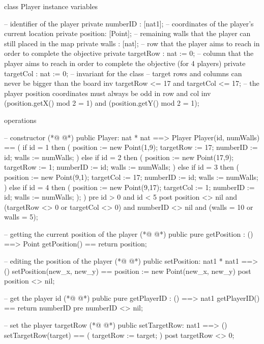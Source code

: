 \begin{vdmpp}[breaklines=true]
class Player
instance variables

   -- identifier of the player
   private numberID : [nat1];
   -- coordinates of the player's current location
   private position: [Point];
   -- remaining walls that the player can still placed in the map
   private walls : [nat];
   -- row that the player aims to reach in order to complete the objective
   private targetRow : nat := 0;
   -- column that the player aims to reach in order to complete the objective (for 4 players)
   private targetCol : nat := 0;
   -- invariant for the class
   -- target rows and columns can never be bigger than the board
   inv targetRow <= 17 and targetCol <= 17;
   -- the player position coordinates must always be odd in row and col
   inv (position.getX() mod 2 = 1) and (position.getY() mod 2 = 1);
   
operations

   -- constructor
(*@
\label{Player:23}
@*)
   public Player: nat * nat ==> Player
   Player(id, numWalls) ==
   (
    if id = 1
    then (
     position := new Point(1,9);
     targetRow := 17;
     numberID := id;
     walls := numWalls;
    )
    else if id = 2
    then (
     position := new Point(17,9);
     targetRow := 1;
     numberID := id;
     walls := numWalls;
    )
    else if id = 3
    then (
     position := new Point(9,1);
     targetCol := 17;
     numberID := id;
     walls := numWalls;
    )
    else if id = 4
    then (
     position := new Point(9,17);
     targetCol := 1;
     numberID := id;
     walls := numWalls;
    );
   )
   pre id > 0 and id < 5
   post position <> nil and (targetRow <> 0 or targetCol <> 0) and numberID <> nil and (walls = 10 or walls = 5);
   
   -- getting the current position of the player
(*@
\label{getPosition:59}
@*)
   public pure getPosition : () ==> Point 
   getPosition() == return position;
   
   -- editing the position of the player
(*@
\label{setPosition:63}
@*)
   public setPosition: nat1 * nat1 ==> ()
   setPosition(new_x, new_y) ==
    position := new Point(new_x, new_y)
   post position <> nil;

   -- get the player id
(*@
\label{getPlayerID:69}
@*)
   public pure getPlayerID : () ==> nat1
   getPlayerID() ==
    return numberID
   pre numberID <> nil;
   
   -- set the player targetRow
(*@
\label{setTargetRow:75}
@*)
   public setTargetRow: nat1 ==> ()
   setTargetRow(target) ==
   (
    targetRow := target;
   )
   post targetRow <> 0;
   

\end{vdmpp}
